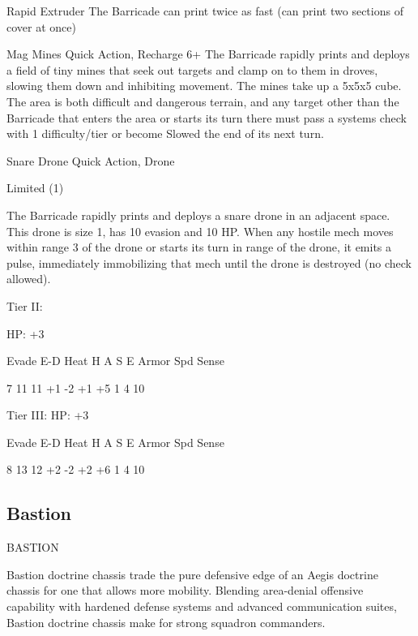 Rapid Extruder  
The Barricade can print twice as fast (can print two sections of cover at once)
 

Mag Mines  
Quick Action, Recharge 6+  
The Barricade rapidly prints and deploys a field of tiny mines that seek out targets and clamp on  
to them in droves, slowing them down and inhibiting movement. The mines take up a 5x5x5  
cube. The area is both difficult and dangerous terrain, and any target other than the Barricade  
that enters the area or starts its turn there must pass a systems check with 1 difficulty/tier or  
become Slowed the end of its next turn.
 

Snare Drone  
Quick Action, Drone
 
Limited (1)
 
The Barricade rapidly prints and deploys a snare drone in an adjacent space. This drone is size  
1, has 10 evasion and 10 HP. When any hostile mech moves within range 3 of the drone or starts  
its turn in range of the drone, it emits a pulse, immediately immobilizing that mech until the drone  
is destroyed (no check allowed).
 

Tier II:
 
HP: +3	
 

          Evade     E-D    Heat    H    A     S     E       Armor        Spd       Sense 

          7         11     11      +1   -2    +1    +5      1            4         10 

Tier III:  
HP: +3
 

          Evade     E-D    Heat    H    A     S     E       Armor        Spd       Sense 

          8         13     12      +2   -2    +2    +6      1            4         10 

                                                                                                                
\subsection{Bastion}

                                               BASTION  

Bastion doctrine chassis trade the pure defensive edge of an Aegis doctrine chassis for one that  
allows more mobility. Blending area-denial offensive capability with hardened defense systems  
and advanced communication suites, Bastion doctrine chassis make for strong squadron  
commanders.   


